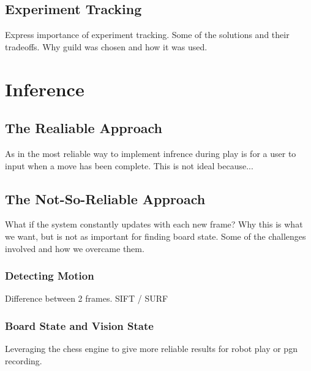 \subsection{Experiment Tracking}
Express importance of experiment tracking.  Some of the solutions \cite{} and their tradeoffs.
Why guild was chosen and how it was used.


\section{Inference}

\subsection{The Realiable Approach}
As in \cite{} the most reliable way to implement infrence during play is for a user to input when a move
has been complete.
This is not ideal because...

\subsection{The Not-So-Reliable Approach}
What if the system constantly updates with each new frame?
Why this is what we want, but is not as important for finding board state.
Some of the challenges involved and how we overcame them.

\subsubsection{Detecting Motion}
Difference between 2 frames.
SIFT / SURF

\subsubsection{Board State and Vision State}
Leveraging the chess engine to give more reliable results for robot play or pgn recording.
